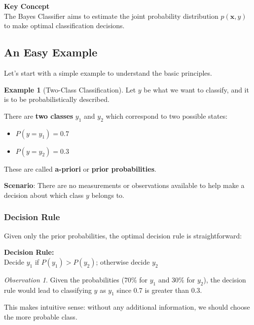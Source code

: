 \documentclass[11pt,a4paper]{article}
\theoremstyle{definition}
\newtheorem{example}{Example}[section]
\theoremstyle{plain}
\theoremstyle{remark}
\newtheorem*{observation}{Observation}
\begin{document}
\begin{center}
\colorbox{orange!15}{\parbox{0.9\textwidth}{
\centering
\textbf{Key Concept}\\[0.2cm]
The Bayes Classifier aims to estimate the joint probability distribution $p(\mathbf{x}, y)$ to make optimal classification decisions.
}}
\end{center}

\subsection{An Easy Example}

Let's start with a simple example to understand the basic principles.

\begin{example}[Two-Class Classification]
Let $y$ be what we want to classify, and it is to be probabilistically described.

There are \textbf{two classes} $y_1$ and $y_2$ which correspond to two possible states:
\begin{itemize}
    \item[a)] $P(y = y_1) = 0.7$
    \item[b)] $P(y = y_2) = 0.3$
\end{itemize}

These are called \textbf{a-priori} or \textbf{prior probabilities}.

\textbf{Scenario}: There are no measurements or observations available to help make a decision about which class $y$ belongs to.
\end{example}

\subsubsection{Decision Rule}

Given only the prior probabilities, the optimal decision rule is straightforward:

\begin{center}
\colorbox{cyan!15}{\parbox{0.85\textwidth}{
\textbf{Decision Rule:}\\[0.2cm]
Decide $y_1$ if $P(y_1) > P(y_2)$; otherwise decide $y_2$
}}
\end{center}

\begin{observation}
Given the probabilities (70\% for $y_1$ and 30\% for $y_2$), the decision rule would lead to classifying $y$ as $y_1$ since 0.7 is greater than 0.3.

This makes intuitive sense: without any additional information, we should choose the more probable class.
\end{observation}
\end{document}
